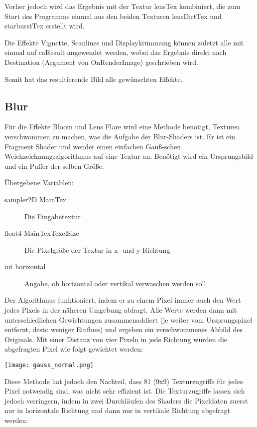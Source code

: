 
Vorher jedoch wird das Ergebnis mit der Textur lensTex kombiniert, die zum Start des Programms einmal aus den beiden Texturen lensDirtTex und starburstTex erstellt wird.


Die Effekte Vignette, Scanlines und Displaykrümmung können zuletzt alle mit einmal auf caResult angewendet werden, wobei das Ergebnis direkt nach Destination (Argument von OnRenderImage) geschrieben wird.


Somit hat das resultierende Bild alle gewünschten Effekte.




\subsection{Blur}
\label{label:blur}

Für die Effekte Bloom und Lens Flare wird eine Methode benötigt, Texturen verschwommen zu machen, was die Aufgabe der Blur-Shaders ist.
Er ist ein Fragment Shader und wendet einen einfachen Gau{\ss}-schen Weichzeichnungsalgorithmus auf eine Textur an. Benötigt wird ein Ursprungsbild und ein Puffer der selben Grö{\ss}e.

Übergebene Variablen:
\begin{description}
\item[sampler2D MainTex] Die Eingabetextur
\item[float4 MainTexTexelSize] Die Pixelgröße der Textur in x- und y-Richtung
\item[int horizontal] Angabe, ob horizontal oder vertikal verwaschen werden soll
\end{description}

Der Algorithmus funktioniert, indem er zu einem Pixel immer auch den Wert jedes Pixels in der näheren Umgebung abfragt. Alle Werte werden dann mit unterschiedlichen Gewichtungen zusammenaddiert (je weiter vom Ursprungspixel entfernt, desto weniger Einfluss) und ergeben ein verschwommenes Abbild des Originals. Mit einer Distanz von vier Pixeln in jede Richtung würden die abgefragten Pixel wie folgt gewichtet werden:

\texttt{[image: gauss\_normal.png]}

Diese Methode hat jedoch den Nachteil, dass 81 (9x9) Texturzugriffe für jedes Pixel notwendig sind, was nicht sehr effizient ist.
Die Texturzugriffe lassen sich jedoch verringern, indem in zwei Durchläufen des Shaders die Pixeldaten zuerst nur in horizontale Richtung und dann nur in vertikale Richtung abgefragt werden:

